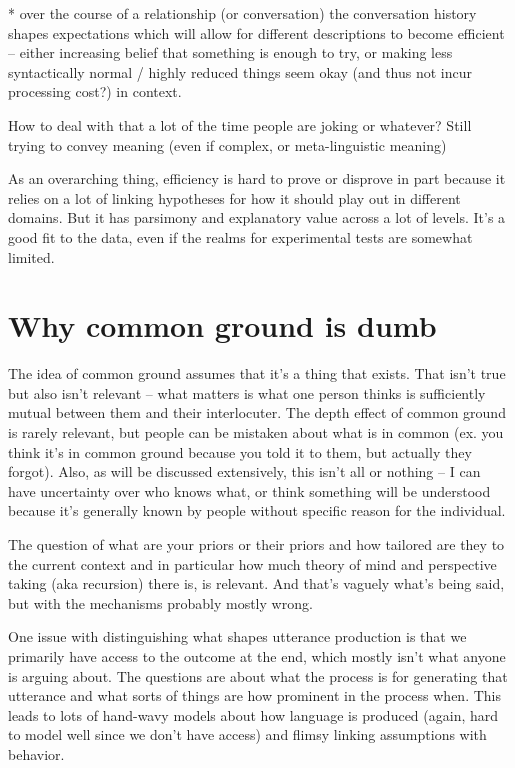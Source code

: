\documentclass[]{article}
\begin{document}
* over the course of a relationship (or conversation) the conversation history shapes expectations which will allow for different descriptions to become efficient -- either increasing belief that something is enough to try, or making less syntactically normal / highly reduced things seem okay (and thus not incur processing cost?) in context. 

How to deal with that a lot of the time people are joking or whatever? Still trying to convey meaning (even if complex, or meta-linguistic meaning)

As an overarching thing, efficiency is hard to prove or disprove in part because it relies on a lot of linking hypotheses for how it should play out in different domains. But it has parsimony and explanatory value across a lot of levels. It's a good fit to the data, even if the realms for experimental tests are somewhat limited. 

\section{Why common ground is dumb}

The idea of common ground assumes that it's a thing that exists. That isn't true but also isn't relevant -- what matters is what one person thinks is sufficiently mutual between them and their interlocuter. The depth effect of common ground is rarely relevant, but people can be mistaken about what is in common (ex. you think it's in common ground because you told it to them, but actually they forgot). Also, as will be discussed extensively, this isn't all or nothing -- I can have uncertainty over who knows what, or think something will be understood because it's generally known by people without specific reason for the individual. 

The question of what are your priors or their priors and how tailored are they to the current context and in particular how much theory of mind and perspective taking (aka recursion) there is, is relevant. And that's vaguely what's being said, but with the mechanisms probably mostly wrong. 

One issue with distinguishing what shapes utterance production is that we primarily have access to the outcome at the end, which mostly isn't what anyone is arguing about. The questions are about what the process is for generating that utterance and what sorts of things are how prominent in the process when. This leads to lots of hand-wavy models about how language is produced (again, hard to model well since we don't have access) and flimsy linking assumptions with behavior. 
\end{document}
